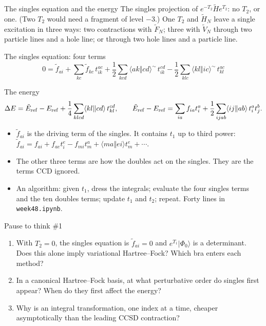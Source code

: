 \documentclass[aspectratio=169,10pt]{beamer}
\newcounter{thinkctr}
\newcommand{\thinkq}[2]{%
  \stepcounter{thinkctr}%
  \vfill
  \begin{tcolorbox}[enhanced,colback=palewarm,colframe=warm,boxrule=1.2pt,arc=4pt,
    grow to left by=6mm,grow to right by=6mm,
    left=16pt,right=16pt,top=16pt,bottom=18pt,
    fonttitle=\bfseries\Large,fontupper=\Large,
    title={Pause to think \#\thethinkctr\hfill\mdseries\normalsize(about #1 min -- discuss with your neighbour)}]
  #2
  \end{tcolorbox}
  \vfill}
\newcommand{\ket}[1]{\vert #1\rangle}
\newcommand{\Eref}{E_{\mathrm{ref}}}
\newcommand{\ph}{\Phi_0}
\newcommand{\as}[4]{\langle #1#2\Vert #3#4\rangle}
\newcommand{\ft}{\tilde f}
\newcommand{\vt}[4]{\langle #1#2\Vert #3#4\rangle^{\sim}}
\begin{document}
\begin{frame}[shrink=13]{The singles equation and the energy}
\small
The singles projection of $e^{-T_2}\tilde He^{T_2}$: no $T_2$, or one. (Two $T_2$ would need a fragment of level $-3$.) One $T_2$ and $\tilde H_N$ leave a single excitation in three ways: two contractions with $\tilde F_N$; three with $\tilde V_N$ through two particle lines and a hole line; or through two hole lines and a particle line.
\begin{block}{The singles equation: four terms}
\[
 0=\ft_{ai}+\sum_{kc}\ft_{kc}\,t_{ik}^{ac}+\frac12\sum_{kcd}\vt akcd\,t_{ik}^{cd}-\frac12\sum_{klc}\vt klic\,t_{kl}^{ac}
\]
\end{block}
\begin{block}{The energy}
\[
 \Delta E=\tilde E_{\rm ref}-\Eref+\frac14\sum_{klcd}\as klcd\,t_{kl}^{cd},\qquad
 \tilde E_{\rm ref}-\Eref=\sum_{ia}f_{ia}t_i^a+\frac12\sum_{ijab}\as ijab\,t_i^at_j^b .
\]
\end{block}
\begin{itemize}
\item $\ft_{ai}$ is the driving term of the singles. It contains $t_1$ up to third power: $\ft_{ai}=f_{ai}+f_{ae}t_i^e-f_{mi}t_m^a+\as maei t_m^e+\cdots$.
\item The other three terms are how the doubles act on the singles. They are the terms CCD ignored.
\item An algorithm: given $t_1$, dress the integrals; evaluate the four singles terms and the ten doubles terms; update $t_1$ and $t_2$; repeat. Forty lines in \texttt{week48.ipynb}.
\end{itemize}
\end{frame}

\begin{frame}{Pause to think \#1}
\thinkq{4}{
\begin{enumerate}
\item With $T_2=0$, the singles equation is $\ft_{ai}=0$ and $e^{T_1}\ket{\ph}$ is a determinant. Does this alone imply variational Hartree--Fock? Which bra enters each method?
\item In a canonical Hartree--Fock basis, at what perturbative order do singles first appear? When do they first affect the energy?
\item Why is an integral transformation, one index at a time, cheaper asymptotically than the leading CCSD contraction?
\end{enumerate}}
\end{frame}
\end{document}
